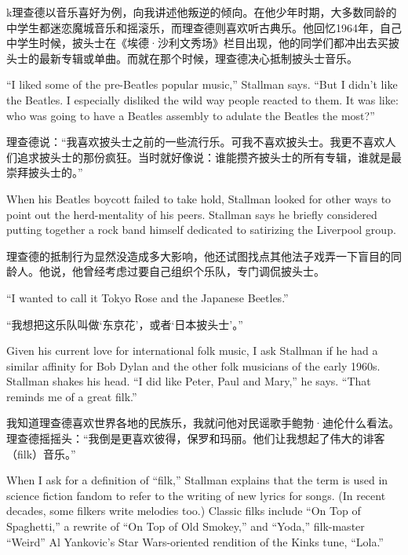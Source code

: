 \ifdefined\chs
k理查德以音乐喜好为例，向我讲述他叛逆的倾向。在他少年时期，大多数同龄的中学生都迷恋魔城音乐和摇滚乐，而理查德则喜欢听古典乐。他回忆1964年，自己中学生时候，披头士在《埃德·沙利文秀场》栏目出现，他的同学们都冲出去买披头士的最新专辑或单曲。而就在那个时候，理查德决心抵制披头士音乐。
\fi

\ifdefined\eng
``I liked some of the pre-Beatles popular music,'' Stallman says. ``But I didn't like the Beatles. I especially disliked the wild way people reacted to them. It was like: who was going to have a Beatles assembly to adulate the Beatles the most?''
\fi

\ifdefined\chs
理查德说：“我喜欢披头士之前的一些流行乐。可我不喜欢披头士。我更不喜欢人们追求披头士的那份疯狂。当时就好像说：谁能攒齐披头士的所有专辑，谁就是最崇拜披头士的。”
\fi

\ifdefined\eng
When his Beatles boycott failed to take hold, Stallman looked for other ways to point out the herd-mentality of his peers. Stallman says he briefly considered putting together a rock band himself dedicated to satirizing the Liverpool group.
\fi

\ifdefined\chs
理查德的抵制行为显然没造成多大影响，他还试图找点其他法子戏弄一下盲目的同龄人。他说，他曾经考虑过要自己组织个乐队，专门调侃披头士。
\fi

\ifdefined\eng
``I wanted to call it Tokyo Rose and the Japanese Beetles.''
\fi

\ifdefined\chs
“我想把这乐队叫做‘东京花’，或者‘日本披头士’。”
\fi

\ifdefined\eng
Given his current love for international folk music, I ask Stallman if he had a similar affinity for Bob Dylan and the other folk musicians of the early 1960s. Stallman shakes his head. ``I did like Peter, Paul and Mary,'' he says. ``That reminds me of a great filk.''
\fi

\ifdefined\chs
我知道理查德喜欢世界各地的民族乐，我就问他对民谣歌手鲍勃·迪伦什么看法。理查德摇摇头：“我倒是更喜欢彼得，保罗和玛丽。他们让我想起了伟大的诽客（filk）音乐。”
\fi

\ifdefined\eng
When I ask for a definition of ``filk,'' Stallman explains that the term is used in science fiction fandom to refer to the writing of new lyrics for songs.  (In recent decades, some filkers write melodies too.)  Classic filks include ``On Top of Spaghetti,'' a rewrite of ``On Top of Old Smokey,'' and ``Yoda,'' filk-master ``Weird'' Al Yankovic's Star Wars-oriented rendition of the Kinks tune, ``Lola.''
\fi

